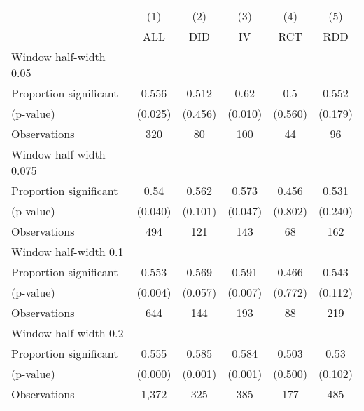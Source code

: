 
\def\sym#1{\ifmmode^{#1}\else\(^{#1}\)\fi}
\begin{tabular}{l*{5}{c}}
\hline\hline
& \multicolumn{1}{c}{(1)} &  \multicolumn{1}{c}{(2)} &  \multicolumn{1}{c}{(3)} &  \multicolumn{1}{c}{(4)} &  \multicolumn{1}{c}{(5)}\\
& \multicolumn{1}{c}{ALL} &  \multicolumn{1}{c}{DID} &  \multicolumn{1}{c}{IV} &  \multicolumn{1}{c}{RCT} &  \multicolumn{1}{c}{RDD}\\

\hline
\hline
Window half-width 0.05\\

Proportion significant& 0.556 &  0.512 &  0.62 &  0.5 &  0.552\\

(p-value) & (0.025) &  (0.456) &  (0.010) &  (0.560) &  (0.179)\\

Observations& 320 &  80 &  100 &  44 &  96\\

\hline
Window half-width 0.075\\

Proportion significant& 0.54 &  0.562 &  0.573 &  0.456 &  0.531\\

(p-value) & (0.040) &  (0.101) &  (0.047) &  (0.802) &  (0.240)\\

Observations& 494 &  121 &  143 &  68 &  162\\

\hline
Window half-width 0.1\\

Proportion significant& 0.553 &  0.569 &  0.591 &  0.466 &  0.543\\

(p-value) & (0.004) &  (0.057) &  (0.007) &  (0.772) &  (0.112)\\

Observations& 644 &  144 &  193 &  88 &  219\\

\hline
Window half-width 0.2\\

Proportion significant& 0.555 &  0.585 &  0.584 &  0.503 &  0.53\\

(p-value) & (0.000) &  (0.001) &  (0.001) &  (0.500) &  (0.102)\\

Observations& 1,372 &  325 &  385 &  177 &  485\\


\end{tabular}
